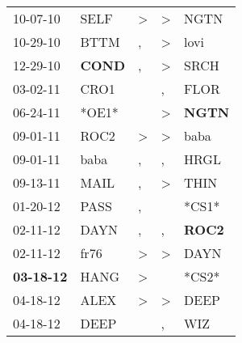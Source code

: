 \begin{supertabular}{p{0.07\textwidth}p{0.06\textwidth}p{0.02\textwidth}p{0.02\textwidth}p{0.06\textwidth}}
          10-07-10\textsuperscript{} &           SELF\textsuperscript{} &     \textgreater &     \textgreater &           NGTN\textsuperscript{} \\
          10-29-10\textsuperscript{} &           BTTM\textsuperscript{} &                , &     \textgreater &           lovi\textsuperscript{} \\
          12-29-10\textsuperscript{} &  \textbf{COND\textsuperscript{}} &                , &     \textgreater &           SRCH\textsuperscript{} \\
          03-02-11\textsuperscript{} &           CRO1\textsuperscript{} &                  &                , &           FLOR\textsuperscript{} \\
          06-24-11\textsuperscript{} &                            *OE1* &                  &     \textgreater &  \textbf{NGTN\textsuperscript{}} \\
          09-01-11\textsuperscript{} &           ROC2\textsuperscript{} &     \textgreater &     \textgreater &           baba\textsuperscript{} \\
          09-01-11\textsuperscript{} &           baba\textsuperscript{} &                , &                , &           HRGL\textsuperscript{} \\
          09-13-11\textsuperscript{} &           MAIL\textsuperscript{} &                , &     \textgreater &           THIN\textsuperscript{} \\
          01-20-12\textsuperscript{} &           PASS\textsuperscript{} &                , &                  &                            *CS1* \\
          02-11-12\textsuperscript{} &           DAYN\textsuperscript{} &                , &                , &  \textbf{ROC2\textsuperscript{}} \\
          02-11-12\textsuperscript{} &           fr76\textsuperscript{} &     \textgreater &     \textgreater &           DAYN\textsuperscript{} \\
 \textbf{03-18-12\textsuperscript{}} &           HANG\textsuperscript{} &     \textgreater &                  &                            *CS2* \\
          04-18-12\textsuperscript{} &           ALEX\textsuperscript{} &     \textgreater &     \textgreater &           DEEP\textsuperscript{} \\
          04-18-12\textsuperscript{} &           DEEP\textsuperscript{} &                  &                , &            WIZ\textsuperscript{} \\

\end{supertabular}
